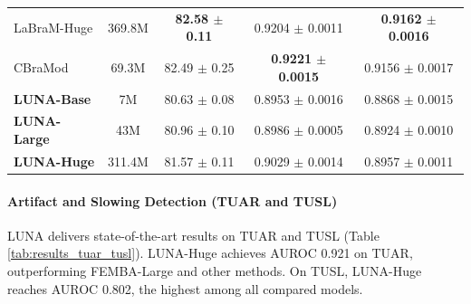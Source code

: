 \begin{table}[htbp!]
\begin{tabular}{@{}lcccc@{}}
        LaBraM-Huge \citep{jiang2024large} & 369.8M & \textbf{82.58 $\pm$ 0.11} & 0.9204 $\pm$ 0.0011 & \textbf{0.9162 $\pm$ 0.0016} \\
        CBraMod \citep{wang2024cbramod} & 69.3M & 82.49 $\pm$ 0.25 & \textbf{0.9221 $\pm$ 0.0015} & 0.9156 $\pm$ 0.0017 \\
        \midrule
        \textbf{LUNA-Base} & 7M & 80.63 $\pm$ 0.08 & 0.8953 $\pm$ 0.0016 & 0.8868 $\pm$ 0.0015 \\
        \textbf{LUNA-Large} & 43M & 80.96 $\pm$ 0.10 & 0.8986 $\pm$ 0.0005 & 0.8924 $\pm$ 0.0010 \\
        \textbf{LUNA-Huge} & 311.4M & 81.57 $\pm$ 0.11 & 0.9029 $\pm$ 0.0014 & 0.8957 $\pm$ 0.0011 \\
        \bottomrule
   \end{tabular}
\end{table}
\paragraph{Artifact and Slowing Detection (TUAR and TUSL)}
LUNA delivers state-of-the-art results on TUAR and TUSL (Table \ref{tab:results_tuar_tusl}). LUNA-Huge achieves AUROC 0.921 on TUAR, outperforming FEMBA-Large and other methods. On TUSL, LUNA-Huge reaches AUROC 0.802, the highest among all compared models. 

